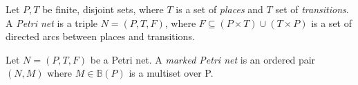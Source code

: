 \begin{comment}
    In the preliminaries you present well-understood mathematical concepts that you need in your thesis.
For example, you can define the natural numbers as $\mathbb{N}{=}\{0,1,2,...\}$, and, correspondingly $\mathbb{N}^+{=}\mathbb{N}{\setminus}\{0\}$.
A preliminary notion is either a well-defined commonly understood mathematical notion, e.g., sets, multisets, graphs, sequences, Petri nets, \dots, or, it is a concept clearly defined in another paper, i.e., you just adopt the notation (or a slight variation thereof).
\emph{Any concept you use should be defined in your thesis}.
You should never write: \enquote{We use Workflow nets, a definition of these can be found here [X]}.
If you use it, explain it.

Concepts that are unique to your approach are not part of the preliminaries, i.e., they are described in the approach section itself.

Some useful tips:
\begin{itemize}
    \item When introducing a complex concept, use the following structure (always works):
    \begin{itemize}
        \item Explain the concept informally.
        \item Provide a formal definition of the concept.
        \item Provide an example, using the formal definition, of the concept.
    \end{itemize}
    In your examples, try to be \emph{as visual as you can}, often, an image says more than 5 pages of text.
    \item use commands, e.g., \texttt{$\backslash$newcommand\{$\backslash$naturals\}\{$\backslash$ensuremath\{$\backslash$mathbb\{N\}\}\}}
\end{itemize}
\end{comment}

\begin{definition}
\label{def:petrinet}
    Let $P, T$ be finite, disjoint sets, where $T$ is a set of \emph{places} and $T$ set of \emph{transitions}. A \emph{Petri net} is a triple $N = (P, T, F)$, where $F \subseteq (P \times T) \cup (T \times P)$ is a set of directed arcs between places and transitions.
\end{definition}

\begin{definition}
    Let $N = (P, T, F)$ be a Petri net. A \emph{marked Petri net} is an ordered pair $(N, M)$ where $M \in \mathbb{B}(P)$ is a multiset over P.
\end{definition}

